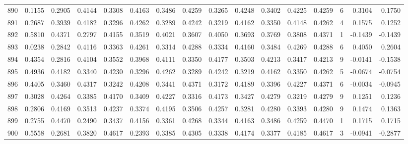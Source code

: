 \begin{tabular}{lrrrrrrrrrrrrrrr}
890 &      0.1155 &  0.2905 &  0.4144 &  0.3308 &  0.4163 &  0.3486 &  0.4259 &  0.3265 &  0.4248 &  0.3402 &   0.4225 &     0.4259 &      6 &                    0.3104 &                     0.1750 \\
891 &      0.2687 &  0.3939 &  0.4182 &  0.3296 &  0.4262 &  0.3289 &  0.4242 &  0.3219 &  0.4162 &  0.3350 &   0.4148 &     0.4262 &      4 &                    0.1575 &                     0.1252 \\
892 &      0.5810 &  0.4371 &  0.2797 &  0.4155 &  0.3519 &  0.4021 &  0.3607 &  0.4050 &  0.3693 &  0.3769 &   0.3808 &     0.4371 &      1 &                   -0.1439 &                    -0.1439 \\
893 &      0.0238 &  0.2842 &  0.4116 &  0.3363 &  0.4261 &  0.3314 &  0.4288 &  0.3334 &  0.4160 &  0.3484 &   0.4269 &     0.4288 &      6 &                    0.4050 &                     0.2604 \\
894 &      0.4354 &  0.2816 &  0.4104 &  0.3552 &  0.3968 &  0.4111 &  0.3350 &  0.4177 &  0.3503 &  0.4213 &   0.3417 &     0.4213 &      9 &                   -0.0141 &                    -0.1538 \\
895 &      0.4936 &  0.4182 &  0.3340 &  0.4230 &  0.3296 &  0.4262 &  0.3289 &  0.4242 &  0.3219 &  0.4162 &   0.3350 &     0.4262 &      5 &                   -0.0674 &                    -0.0754 \\
896 &      0.4405 &  0.3460 &  0.4317 &  0.3242 &  0.4208 &  0.3441 &  0.4371 &  0.3172 &  0.4189 &  0.3396 &   0.4227 &     0.4371 &      6 &                   -0.0034 &                    -0.0945 \\
897 &      0.3028 &  0.4264 &  0.3385 &  0.4170 &  0.3409 &  0.4227 &  0.3316 &  0.4173 &  0.3427 &  0.4279 &   0.3219 &     0.4279 &      9 &                    0.1251 &                     0.1236 \\
898 &      0.2806 &  0.4169 &  0.3513 &  0.4237 &  0.3374 &  0.4195 &  0.3506 &  0.4257 &  0.3281 &  0.4280 &   0.3393 &     0.4280 &      9 &                    0.1474 &                     0.1363 \\
899 &      0.2755 &  0.4470 &  0.2490 &  0.3437 &  0.4156 &  0.3361 &  0.4268 &  0.3344 &  0.4163 &  0.3486 &   0.4259 &     0.4470 &      1 &                    0.1715 &                     0.1715 \\
900 &      0.5558 &  0.2681 &  0.3820 &  0.4617 &  0.2393 &  0.3385 &  0.4305 &  0.3338 &  0.4174 &  0.3377 &   0.4185 &     0.4617 &      3 &                   -0.0941 &                    -0.2877 \\

\end{tabular}
